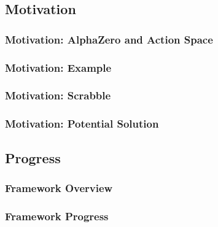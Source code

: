 \documentclass{beamer}
\begin{document}
\subsection{Motivation}


\begin{frame}
\frametitle{Motivation: AlphaZero and Action Space}
\end{frame}



\begin{frame}
\frametitle{Motivation: Example}
\end{frame}



\begin{frame}
\frametitle{Motivation: Scrabble}
\end{frame}



\begin{frame}
\frametitle{Motivation: Potential Solution}
\end{frame}


\subsection{Progress}


\begin{frame}
\frametitle{Framework Overview}
\end{frame}



\begin{frame}
\frametitle{Framework Progress}
\end{frame}

\end{document}
